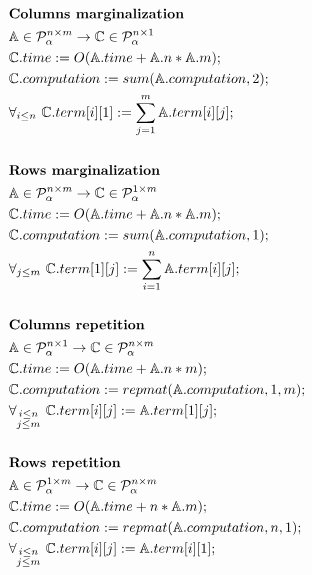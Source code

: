 \begin{figure}
\begin{framed}
\begin{align*}
&\text{{\bf Columns marginalization}}\\
&\mathbb{A} \in \mathcal{P}^{n \times m}_\alpha \rightarrow \mathbb{C} \in \mathcal{P}^{n \times 1}_\alpha \\
&\mathbb{C}.time := O(\mathbb{A}.time + \mathbb{A}.n * \mathbb{A}.m);\\
&\mathbb{C}.computation := sum(\mathbb{A}.computation, 2); \\
&\forall_{i \leq n}\text{ }\mathbb{C}.term[i][1] := \sum_{j = 1}^m \mathbb{A}.term[i][j];\\
& \\
&\text{{\bf Rows marginalization}}\\
&\mathbb{A} \in \mathcal{P}^{n \times m}_\alpha \rightarrow \mathbb{C} \in \mathcal{P}^{1 \times m}_\alpha \\
&\mathbb{C}.time := O(\mathbb{A}.time + \mathbb{A}.n * \mathbb{A}.m);\\
&\mathbb{C}.computation := sum(\mathbb{A}.computation, 1); \\
&\forall_{j \leq m}\text{ }\mathbb{C}.term[1][j] := \sum_{i = 1}^n \mathbb{A}.term[i][j];\\
& \\
&\text{{\bf Columns repetition}}\\
&\mathbb{A} \in \mathcal{P}^{n \times 1}_\alpha \rightarrow \mathbb{C} \in \mathcal{P}^{n \times m}_\alpha \\
&\mathbb{C}.time := O(\mathbb{A}.time + \mathbb{A}.n * m);\\
&\mathbb{C}.computation := repmat(\mathbb{A}.computation, 1, m); \\
&\forall_{\substack{i \leq n\\ j \leq  m}}\text{ } \mathbb{C}.term[i][j] := \mathbb{A}.term[1][j];\\
& \\
&\text{{\bf Rows repetition}}\\
&\mathbb{A} \in \mathcal{P}^{1 \times m}_\alpha \rightarrow \mathbb{C} \in \mathcal{P}^{n \times m}_\alpha \\
&\mathbb{C}.time := O(\mathbb{A}.time + n * \mathbb{A}.m);\\
&\mathbb{C}.computation := repmat(\mathbb{A}.computation, n, 1); \\
&\forall_{\substack{i \leq n\\j \leq m}}\text{ } \mathbb{C}.term[i][j] := \mathbb{A}.term[i][1];\\

\end{align*}
\end{framed}
\end{figure}
